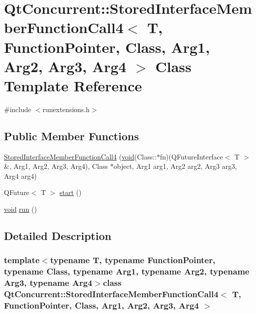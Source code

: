 \hypertarget{class_qt_concurrent_1_1_stored_interface_member_function_call4}{\section{\-Qt\-Concurrent\-:\-:\-Stored\-Interface\-Member\-Function\-Call4$<$ \-T, \-Function\-Pointer, \-Class, \-Arg1, \-Arg2, \-Arg3, \-Arg4 $>$ \-Class \-Template \-Reference}
\label{class_qt_concurrent_1_1_stored_interface_member_function_call4}
}


{\ttfamily \#include $<$runextensions.\-h$>$}

\subsection*{\-Public \-Member \-Functions}
\begin{DoxyCompactItemize}
\item 
\hyperlink{class_qt_concurrent_1_1_stored_interface_member_function_call4_aa7a9e1003d2d3b79fed31c04a04ecabb}{\-Stored\-Interface\-Member\-Function\-Call4} (\hyperlink{group___u_a_v_objects_plugin_ga444cf2ff3f0ecbe028adce838d373f5c}{void}(\-Class\-::$\ast$fn)(\-Q\-Future\-Interface$<$ \-T $>$ \&, \-Arg1, \-Arg2, \-Arg3, \-Arg4), \-Class $\ast$object, \-Arg1 arg1, \-Arg2 arg2, \-Arg3 arg3, \-Arg4 arg4)
\item 
\-Q\-Future$<$ \-T $>$ \hyperlink{class_qt_concurrent_1_1_stored_interface_member_function_call4_a361322fcb4067f0acfe514be8d1fcbeb}{start} ()
\item 
\hyperlink{group___u_a_v_objects_plugin_ga444cf2ff3f0ecbe028adce838d373f5c}{void} \hyperlink{class_qt_concurrent_1_1_stored_interface_member_function_call4_a157bf2ef24bb8e9daa09b3ff78b0ea95}{run} ()
\end{DoxyCompactItemize}


\subsection{\-Detailed \-Description}
\subsubsection*{template$<$typename T, typename Function\-Pointer, typename Class, typename Arg1, typename Arg2, typename Arg3, typename Arg4$>$class Qt\-Concurrent\-::\-Stored\-Interface\-Member\-Function\-Call4$<$ T, Function\-Pointer, Class, Arg1, Arg2, Arg3, Arg4 $>$}



